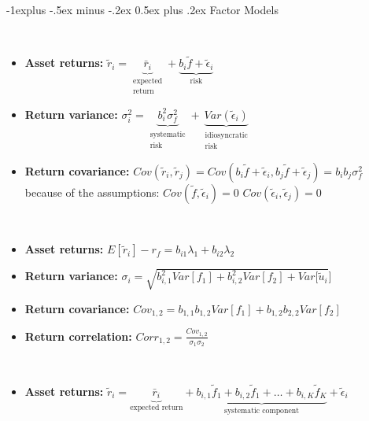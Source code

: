 \documentclass[10pt,landscape,a4paper]{article}
\makeatletter
\renewcommand{\subsection}{\@startsection{subsection}{2}{0mm}%
                                {-1explus -.5ex minus -.2ex}%
                                {0.5ex plus .2ex}%
                                {\normalfont\normalsize\bfseries}}
\makeatother
\begin{document}
\begin{multicols*}{3}
\subsection{Factor Models}

\begin{description}[itemsep=0pt]
	\item[A single-factor model]  ~
	\begin{itemize}
		\item {\bf Asset returns:} $ \tilde{r}_i = \underbrace{\bar{r}_i}_{\substack{\text{expected} \\ \text{return}}} +  \underbrace{b_i \tilde{f} + \tilde{\epsilon}_i}_{\text{risk}} $
		\item {\bf Return variance:} $ \sigma_i^2 = \underbrace{b_i^2 \sigma_f^2}_{\substack{\text{systematic} \\ \text{risk}}} +  \underbrace{Var(\tilde{\epsilon}_i)}_{\substack{\text{idiosyncratic} \\ \text{risk}}} $
		\item {\bf Return covariance:} $ Cov( \tilde{r}_i,  \tilde{r}_j) = Cov(b_i \tilde{f} + \tilde{\epsilon}_i, b_j \tilde{f} + \tilde{\epsilon}_j) = b_i b_j \sigma_f^2 $ because of the assumptions:
		$Cov(\tilde{f}, \tilde{\epsilon}_i ) = 0$
		$Cov( \tilde{\epsilon}_i , \tilde{\epsilon}_j ) = 0$
			
	\end{itemize}
\end{description}

\begin{description}[itemsep=0pt]
	\item[Two-factor model]  ~
	\begin{itemize}
		\item {\bf Asset returns:} $ E[\tilde{r}_i] - r_f =  b_{i1} \lambda_1 + b_{i2} \lambda_2 $
		\item {\bf Return variance:} $ \sigma_i = \sqrt{ b_{i,1}^2 Var[f_1] +  b_{i,2}^2 Var[f_2] + Var[\tilde{u}_i}]$
		\item {\bf Return covariance:} $ Cov_{1,2} =  b_{1,1} b_{1,2} Var[f_1]  +  b_{1,2} b_{2,2} Var[f_2]$
		\item {\bf Return correlation:} $ Corr_{1,2} = \frac{Cov_{1,2}}{\sigma_1 \sigma_2}$
		
	\end{itemize}
\end{description}


\begin{description}[itemsep=0pt]
	\item[Multifactor models]  ~
	\begin{itemize}
		\item {\bf Asset returns:} $ \tilde{r}_i = \underbrace{\bar{r}_i}_{\text{expected return}} +  \underbrace{b_{i,1} \tilde{f}_1 + b_{i,2} \tilde{f}_1 + \dots + b_{i,K} \tilde{f}_K }_{\text{systematic component}}  +\tilde{\epsilon}_i $


\end{itemize}
\end{description}
\end{multicols*}
\end{document}
